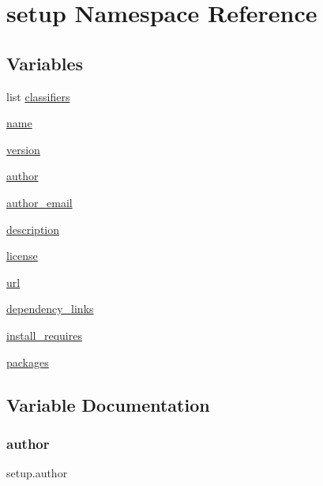 \hypertarget{namespacesetup}{}\section{setup Namespace Reference}
\label{namespacesetup}
\subsection*{Variables}
\begin{DoxyCompactItemize}
\item 
list \hyperlink{namespacesetup_abe96a9c38c1c61f9f0fdb002c482f785}{classifiers}
\item 
\hyperlink{namespacesetup_ab3a7a0638d76a01367c5bc3cc699447f}{name}
\item 
\hyperlink{namespacesetup_a2aa722b36a933088812b50ea79b97a5c}{version}
\item 
\hyperlink{namespacesetup_a3a57a4772d418a06835249cbade0d86a}{author}
\item 
\hyperlink{namespacesetup_a5b08034343aa2be607722a8b315f3625}{author\+\_\+email}
\item 
\hyperlink{namespacesetup_aedf461ec52a946bda975938ba0b93ec0}{description}
\item 
\hyperlink{namespacesetup_a8ed6f50a28bd6a8794f8e1153baa6de9}{license}
\item 
\hyperlink{namespacesetup_afc13124aa5c0124e84e1d965e3f4b0fb}{url}
\item 
\hyperlink{namespacesetup_a4c271d0ea7acb1aa7f9a8120390e89ba}{dependency\+\_\+links}
\item 
\hyperlink{namespacesetup_abead4f26b530856f858f0d44c7cf2588}{install\+\_\+requires}
\item 
\hyperlink{namespacesetup_aff2375a361fd5865c77bd9aa093be747}{packages}
\end{DoxyCompactItemize}


\subsection{Variable Documentation}
\mbox{\label{namespacesetup_a3a57a4772d418a06835249cbade0d86a}} 
\subsubsection{\texorpdfstring{author}{author}}
{\footnotesize\ttfamily setup.\+author}

